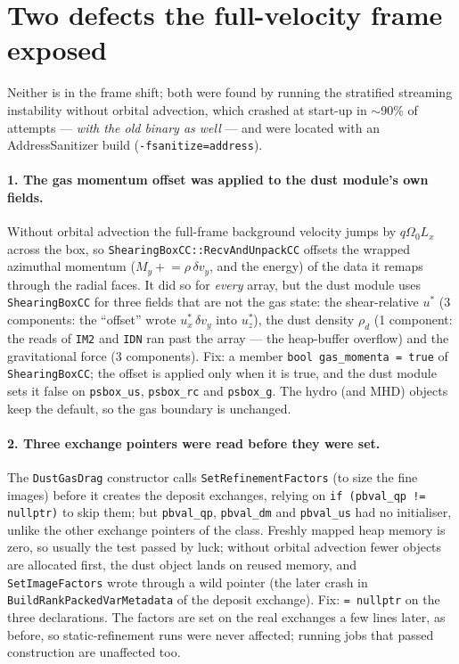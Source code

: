 \documentclass[11pt]{article}
\newcommand{\code}[1]{\texttt{#1}}
\newcommand{\fn}[1]{\texttt{\small #1}}
\newcommand{\Om}{\Omega_0}
\newcommand{\qom}{q\Om}
\begin{document}
\section{Two defects the full-velocity frame exposed}

Neither is in the frame shift; both were found by running the stratified streaming
instability without orbital advection, which crashed at start-up in $\sim$90\% of
attempts --- \emph{with the old binary as well} --- and were located with an
AddressSanitizer build (\code{-fsanitize=address}).

\paragraph{1. The gas momentum offset was applied to the dust module's own fields.}
Without orbital advection the full-frame background velocity jumps by $\qom L_x$ across
the box, so \fn{ShearingBoxCC::RecvAndUnpackCC} offsets the wrapped azimuthal momentum
($M_y \mathrel{+}= \rho\,\delta v_y$, and the energy) of the data it remaps through the
radial faces.  It did so for \emph{every} array, but the dust module uses
\fn{ShearingBoxCC} for three fields that are not the gas state: the shear-relative
$u^\ast$ (3 components: the ``offset'' wrote $u^\ast_x\,\delta v_y$ into $u^\ast_z$), the
dust density $\rho_d$ (1 component: the reads of \code{IM2} and \code{IDN} ran past the
array --- the heap-buffer overflow) and the gravitational force (3 components).  Fix: a
member \code{bool gas\_momenta = true} of \fn{ShearingBoxCC}; the offset is applied only
when it is true, and the dust module sets it false on \code{psbox\_us}, \code{psbox\_rc}
and \code{psbox\_g}.  The hydro (and MHD) objects keep the default, so the gas boundary is
unchanged.

\paragraph{2. Three exchange pointers were read before they were set.}  The
\fn{DustGasDrag} constructor calls \fn{SetRefinementFactors} (to size the fine images)
before it creates the deposit exchanges, relying on \code{if (pbval\_qp != nullptr)} to
skip them; but \code{pbval\_qp}, \code{pbval\_dm} and \code{pbval\_us} had no initialiser,
unlike the other exchange pointers of the class.  Freshly mapped heap memory is zero, so
usually the test passed by luck; without orbital advection fewer objects are allocated
first, the dust object lands on reused memory, and \fn{SetImageFactors} wrote through a
wild pointer (the later crash in \fn{BuildRankPackedVarMetadata} of the deposit
exchange).  Fix: \code{= nullptr} on the three declarations.  The factors are set on the
real exchanges a few lines later, as before, so static-refinement runs were never
affected; running jobs that passed construction are unaffected too.
\end{document}
